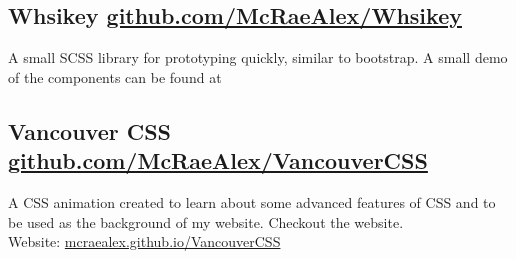\documentclass{article}
\newcommand{\hrefColored}[3]{\href{#2}{\color{#1}{#3}}}
\begin{document}
\subsection{Whsikey \href{https://github.com/McRaeAlex/Whiskey}{github.com/McRaeAlex/Whsikey}}

A small SCSS library for prototyping quickly, similar to bootstrap. A small demo
of the components can be found at 
\hrefColored{blue}{https://mcraealex.github.io/Whiskey}{https://mcraealex.github.io/Whiskey}

\subsection{Vancouver CSS  \href{https://github.com/McRaeAlex/VancouverCSS}{github.com/McRaeAlex/VancouverCSS}}

A CSS animation created to learn about some advanced features of CSS and to be 
used as the background of my website. Checkout the website.\\
\indent Website: \href{https://mcraealex.github.io/VancouverCSS/}{mcraealex.github.io/VancouverCSS}
\end{document}
